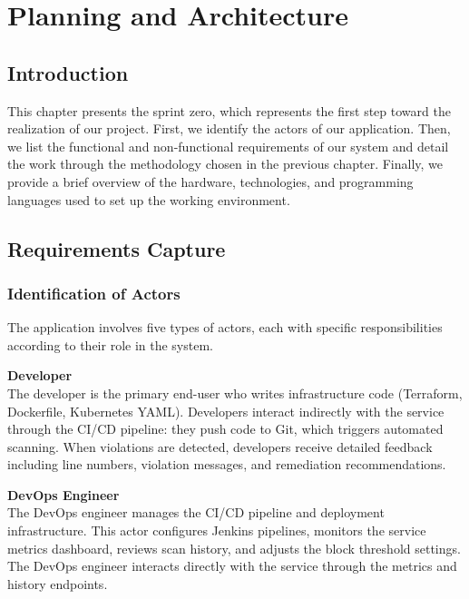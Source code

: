 
\chapter{Planning and Architecture}

\section{Introduction}

This chapter presents the sprint zero, which represents the first step toward the realization of our project. First, we identify the actors of our application. Then, we list the functional and non-functional requirements of our system and detail the work through the methodology chosen in the previous chapter. Finally, we provide a brief overview of the hardware, technologies, and programming languages used to set up the working environment.

\section{Requirements Capture}

\subsection{Identification of Actors}

The application involves five types of actors, each with specific responsibilities according to their role in the system.

\vspace{0.3cm}
\noindent\textbf{Developer} \\
The developer is the primary end-user who writes infrastructure code (Terraform, Dockerfile, Kubernetes YAML). Developers interact indirectly with the service through the CI/CD pipeline: they push code to Git, which triggers automated scanning. When violations are detected, developers receive detailed feedback including line numbers, violation messages, and remediation recommendations.

\vspace{0.3cm}
\noindent\textbf{DevOps Engineer} \\
The DevOps engineer manages the CI/CD pipeline and deployment infrastructure. This actor configures Jenkins pipelines, monitors the service metrics dashboard, reviews scan history, and adjusts the block threshold settings. The DevOps engineer interacts directly with the service through the metrics and history endpoints.

